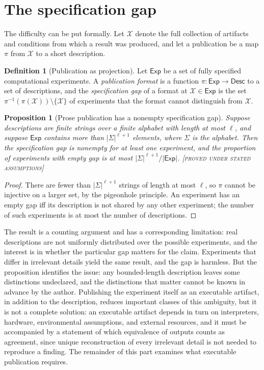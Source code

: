 \documentclass[11pt,twoside,openright]{book}
\theoremstyle{plain}
\newtheorem{proposition}[theorem]{Proposition}
\theoremstyle{definition}
\newtheorem{definition}[theorem]{Definition}
\theoremstyle{remark}
\newcommand{\Proved}{\textup{\textsc{[proved under stated assumptions]}}}
\begin{document}
\section{The specification gap}

The difficulty can be put formally. Let $\mathcal{X}$ denote the full collection of artifacts and conditions from which a result was produced, and let a publication be a map $\pi$ from $\mathcal{X}$ to a short description.

\begin{definition}[Publication as projection]\label{def:pubproj}
Let $\mathsf{Exp}$ be a set of fully specified computational experiments. A \emph{publication format} is a function $\pi:\mathsf{Exp}\to\mathsf{Desc}$ to a set of descriptions, and the \emph{specification gap} of a format at $\mathcal{X}\in\mathsf{Exp}$ is the set $\pi^{-1}(\pi(\mathcal{X}))\setminus\{\mathcal{X}\}$ of experiments that the format cannot distinguish from $\mathcal{X}$.
\end{definition}

\begin{proposition}[Prose publication has a nonempty specification gap]\label{prop:gap}
Suppose descriptions are finite strings over a finite alphabet with length at most $\ell$, and suppose $\mathsf{Exp}$ contains more than $|\Sigma|^{\ell+1}$ elements, where $\Sigma$ is the alphabet. Then the specification gap is nonempty for at least one experiment, and the proportion of experiments with empty gap is at most $|\Sigma|^{\ell+1}/|\mathsf{Exp}|$.
\Proved{}
\end{proposition}

\begin{proof}
There are fewer than $|\Sigma|^{\ell+1}$ strings of length at most $\ell$, so $\pi$ cannot be injective on a larger set, by the pigeonhole principle. An experiment has an empty gap iff its description is not shared by any other experiment; the number of such experiments is at most the number of descriptions.
\end{proof}

The result is a counting argument and has a corresponding limitation: real descriptions are not uniformly distributed over the possible experiments, and the interest is in whether the particular gap matters for the claim. Experiments that differ in irrelevant details yield the same result, and the gap is harmless. But the proposition identifies the issue: any bounded-length description leaves some distinctions undeclared, and the distinctions that matter cannot be known in advance by the author. Publishing the experiment itself as an executable artifact, in addition to the description, reduces important classes of this ambiguity, but it is not a complete solution: an executable artifact depends in turn on interpreters, hardware, environmental assumptions, and external resources, and it must be accompanied by a statement of which equivalence of outputs counts as agreement, since unique reconstruction of every irrelevant detail is not needed to reproduce a finding. The remainder of this part examines what executable publication requires.
\end{document}
